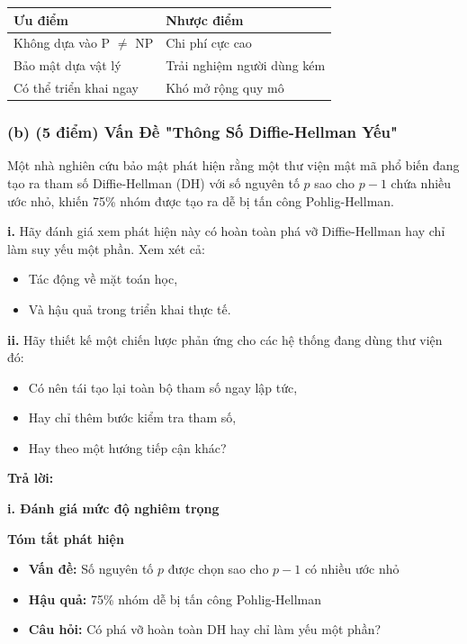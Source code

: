 \begin{center}
\begin{tabular}{|p{6cm}|p{6cm}|}
\hline
\textbf{Ưu điểm} & \textbf{Nhược điểm} \\
\hline
Không dựa vào P $\neq$ NP & Chi phí cực cao \\
Bảo mật dựa vật lý & Trải nghiệm người dùng kém \\
Có thể triển khai ngay & Khó mở rộng quy mô \\
\hline
\end{tabular}
\end{center}

\subsubsection{(b) (5 điểm) Vấn Đề "Thông Số Diffie-Hellman Yếu"}

Một nhà nghiên cứu bảo mật phát hiện rằng một thư viện mật mã phổ biến đang tạo ra tham số Diffie-Hellman (DH) với số nguyên tố $p$ sao cho $p - 1$ chứa nhiều ước nhỏ, khiến 75\% nhóm được tạo ra dễ bị tấn công Pohlig-Hellman.

\textbf{i.} Hãy đánh giá xem phát hiện này có hoàn toàn phá vỡ Diffie-Hellman hay chỉ làm suy yếu một phần.
Xem xét cả:
\begin{itemize}
    \item Tác động về mặt toán học,
    \item Và hậu quả trong triển khai thực tế.
\end{itemize}

\textbf{ii.} Hãy thiết kế một chiến lược phản ứng cho các hệ thống đang dùng thư viện đó:
\begin{itemize}
    \item Có nên tái tạo lại toàn bộ tham số ngay lập tức,
    \item Hay chỉ thêm bước kiểm tra tham số,
    \item Hay theo một hướng tiếp cận khác?
\end{itemize}

\begin{center}
    \textbf{Trả lời:}
\end{center}

\textbf{i. Đánh giá mức độ nghiêm trọng}

\textbf{Tóm tắt phát hiện}
\begin{itemize}
    \item \textbf{Vấn đề:} Số nguyên tố $p$ được chọn sao cho $p-1$ có nhiều ước nhỏ
    \item \textbf{Hậu quả:} 75\% nhóm dễ bị tấn công Pohlig-Hellman
    \item \textbf{Câu hỏi:} Có phá vỡ hoàn toàn DH hay chỉ làm yếu một phần?
\end{itemize}

